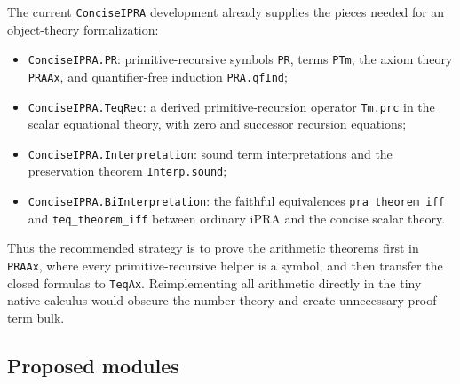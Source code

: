 \documentclass[11pt]{article}
\theoremstyle{definition}
\newcommand{\code}[1]{\nolinkurl{#1}}
\begin{document}
The current \code{ConciseIPRA} development already supplies the pieces needed
for an object-theory formalization:
\begin{itemize}
\item \code{ConciseIPRA.PR}: primitive-recursive symbols \code{PR}, terms
\code{PTm}, the axiom theory \code{PRAAx}, and quantifier-free induction
\code{PRA.qfInd};
\item \code{ConciseIPRA.TeqRec}: a derived primitive-recursion operator
\code{Tm.prc} in the scalar equational theory, with zero and successor
recursion equations;
\item \code{ConciseIPRA.Interpretation}: sound term interpretations and the
preservation theorem \code{Interp.sound};
\item \code{ConciseIPRA.BiInterpretation}: the faithful equivalences
\code{pra\_theorem\_iff} and \code{teq\_theorem\_iff} between ordinary iPRA
and the concise scalar theory.
\end{itemize}
Thus the recommended strategy is to prove the arithmetic theorems first in
\code{PRAAx}, where every primitive-recursive helper is a symbol, and then
transfer the closed formulas to \code{TeqAx}.  Reimplementing all arithmetic
directly in the tiny native calculus would obscure the number theory and
create unnecessary proof-term bulk.

\subsection{Proposed modules}
\end{document}
